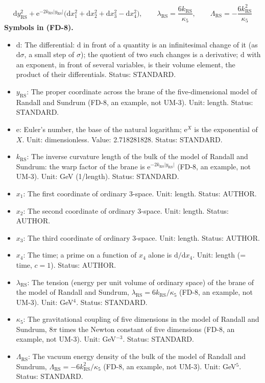 \documentclass[
  10pt,
]{article}
\providecommand{\tightlist}{%
  \setlength{\itemsep}{0pt}\setlength{\parskip}{0pt}}
\begin{document}
\[
\mathrm{d}y_{\mathrm{RS}}^2 + \mathrm{e}^{-2k_{\mathrm{RS}}\lvert y_{\mathrm{RS}}\rvert}\big(\mathrm{d}x_1^2 + \mathrm{d}x_2^2 + \mathrm{d}x_3^2
 - \mathrm{d}x_4^2\big),\qquad \lambda_{\mathrm{RS}} = \frac{6k_{\mathrm{RS}}}{\kappa_5},\qquad \Lambda_{\mathrm{RS}} = -\frac{6k_{\mathrm{RS}}^2}{\kappa_5} \tag{FD-8}
\] \textbf{Symbols in (FD-8).}

\begin{itemize}
\tightlist
\item
  \(\mathrm{d}\): The differential: \(\mathrm{d}\) in front of a
  quantity is an infinitesimal change of it (as \(\mathrm{d}\sigma\), a
  small step of \(\sigma\)); the quotient of two such changes is a
  derivative; \(\mathrm{d}\) with an exponent, in front of several
  variables, is their volume element, the product of their
  differentials. Status: STANDARD.
\item
  \(y_{\mathrm{RS}}\): The proper coordinate across the brane of the
  five-dimensional model of Randall and Sundrum (FD-8, an example, not
  UM-3). Unit: length. Status: STANDARD.
\item
  \(\mathrm{e}\): Euler's number, the base of the natural logarithm;
  \(\mathrm{e}^{X}\) is the exponential of \(X\). Unit: dimensionless.
  Value: 2.718281828. Status: STANDARD.
\item
  \(k_{\mathrm{RS}}\): The inverse curvature length of the bulk of the
  model of Randall and Sundrum: the warp factor of the brane is
  \(\mathrm{e}^{-2k_{\mathrm{RS}}\lvert y_{\mathrm{RS}}\rvert}\) (FD-8,
  an example, not UM-3). Unit: GeV (1/length). Status: STANDARD.
\item
  \(x_1\): The first coordinate of ordinary 3-space. Unit: length.
  Status: AUTHOR.
\item
  \(x_2\): The second coordinate of ordinary 3-space. Unit: length.
  Status: AUTHOR.
\item
  \(x_3\): The third coordinate of ordinary 3-space. Unit: length.
  Status: AUTHOR.
\item
  \(x_4\): The time; a prime on a function of \(x_4\) alone is
  \(\mathrm{d}/\mathrm{d}x_4\). Unit: length (= time, \(c = 1\)).
  Status: AUTHOR.
\item
  \(\lambda_{\mathrm{RS}}\): The tension (energy per unit volume of
  ordinary space) of the brane of the model of Randall and Sundrum,
  \(\lambda_{\mathrm{RS}} = 6k_{\mathrm{RS}}/\kappa_5\) (FD-8, an
  example, not UM-3). Unit: GeV\(^4\). Status: STANDARD.
\item
  \(\kappa_5\): The gravitational coupling of five dimensions in the
  model of Randall and Sundrum, \(8\pi\) times the Newton constant of
  five dimensions (FD-8, an example, not UM-3). Unit: GeV\(^{-3}\).
  Status: STANDARD.
\item
  \(\Lambda_{\mathrm{RS}}\): The vacuum energy density of the bulk of
  the model of Randall and Sundrum,
  \(\Lambda_{\mathrm{RS}} = -6k_{\mathrm{RS}}^2/\kappa_5\) (FD-8, an
  example, not UM-3). Unit: GeV\(^5\). Status: STANDARD.
\end{itemize}
\end{document}
